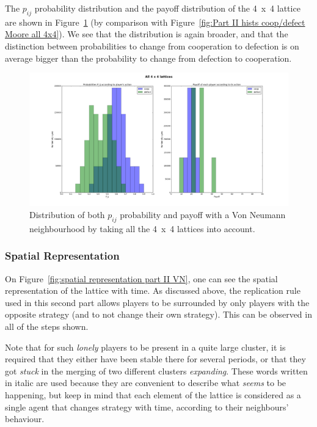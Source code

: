\documentclass{article}
\begin{document}
The $p_{ij}$ probability distribution and the payoff distribution of the 4~x~4 lattice are shown in
Figure~\ref{fig:hists coop/defect 4x4 VN} (by comparison with Figure~\ref{fig:Part II hists coop/defect Moore all 4x4}).
We see that the distribution is again broader, and that the distinction between probabilities to change from
cooperation to defection is on average bigger than the probability to change from defection to cooperation.

\begin{figure}[!t]
\hspace{-1.8cm}
\includegraphics[width=1.2\textwidth]{imgs/part2_diff_coop_defect_0_to_1_4x4_VN.png}
\caption{Distribution of both $p_{ij}$ probability and payoff with a Von Neumann neighbourhood by taking all the
4~x~4 lattices into account.\label{fig:hists coop/defect 4x4 VN}}
\end{figure}

\newpage

\subsubsection{Spatial Representation}

On Figure~\ref{fig:spatial representation part II VN}, one can see the spatial representation of the lattice
with time. As discussed above, the replication rule used in this second part allows players to be surrounded
by only players with the opposite strategy (and to not change their own strategy). This can be observed in
all of the steps shown.

Note that for such \textit{lonely} players to be present in a quite large cluster, it is required that they
either have been stable there for several periods, or that they got \textit{stuck} in the merging of two
different clusters \textit{expanding}. These words written in italic are used because they are convenient
to describe what \textit{seems} to be happening, but keep in mind that each element of the lattice is considered
as a single agent that changes strategy with time, according to their neighbours' behaviour.
\end{document}

